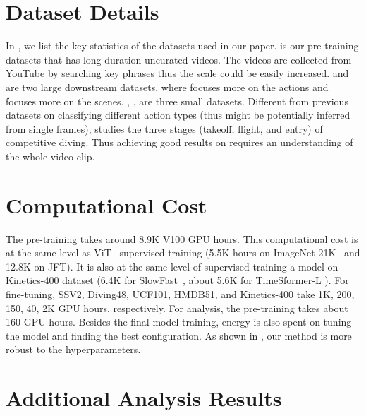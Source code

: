 \section{Dataset Details}
\label{sec:appen_dataset}
In , we list the key statistics of the datasets used in our paper.
\htm is our pre-training datasets that has long-duration uncurated videos.
The videos are collected from YouTube by searching key phrases thus the scale could be easily increased. 
\ssv and \ksmall are two large downstream datasets, where \ssv focuses more on the actions and \ksmall focuses more on the scenes.
\diving, \ucf, \hmdb are three small datasets.
Different from previous datasets on classifying different action types (thus might be potentially inferred from single frames), \diving studies the three stages (takeoff, flight, and entry) of competitive diving.
Thus achieving good results on \diving requires an understanding of the whole video clip.

\section{Computational Cost}
The pre-training takes around 8.9K V100 GPU hours. 
This computational cost is at the same level as ViT~\cite{dosovitskiy2020image} supervised training (5.5K hours on ImageNet-21K~\cite{russakovsky2015imagenet} and 12.8K on JFT\cite{sun2017revisiting}).
It is also at the same level of supervised training a model on Kinetics-400 dataset (6.4K for SlowFast~\cite{feichtenhofer2019slowfast}, about 5.6K for TimeSformer-L \cite{bertasius2021space}).
For fine-tuning, SSV2, Diving48, UCF101, HMDB51, and Kinetics-400 take 1K, 200, 150, 40, 2K GPU hours, respectively.
For analysis, the pre-training takes about 160 GPU hours.
Besides the final model training, energy is also spent on tuning the model and finding the best configuration.
As shown in , our method is more robust to the hyperparameters.


\section{Additional Analysis Results}
\label{sec:appen_analysis}

